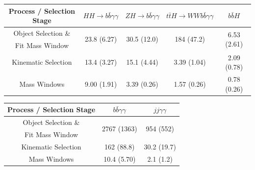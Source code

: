 \begin{table}[!ht]
\begin{center} 
\begin{tabular}{|c|c|c|c|c|}
\hline
Process / Selection Stage            &  $HH \rightarrow b\bar{b}\gamma\gamma$  &  $ZH \rightarrow b\bar{b}\gamma\gamma$ &  $t\bar{t}H \rightarrow W W b \bar{b}\gamma\gamma$ &  $b\bar{b}H$                   \\  \hline
Object Selection \&                  &  \multirow{2}{*}{23.8 (6.27)}            &  \multirow{2}{*}{30.5 (12.0)}           &  \multirow{2}{*}{184 (47.2)}                      &  \multirow{2}{*}{6.53 (2.61)}    \\ 
Fit Mass Window                      &                                         &                                        &                                                    &                                \\ 

Kinematic Selection                  &  13.4 (3.27)                             &  15.1  (4.44)                            &  3.39  (1.04)                                        &  2.09 (0.78)       \\ 
Mass Windows                         &  9.00 (1.91)                              &  3.39  (0.26)                            &  1.57 (0.26)                                         &  0.78 (0.26)       \\  \hline

\end{tabular}

\vspace{2mm}

\begin{tabular}{|c|c|c|}
\hline
Process / Selection Stage           &  $b \bar{b} \gamma\gamma$   & $jj \gamma\gamma$            \\  \hline
Object Selection \&                 &  \multirow{2}{*}{2767 (1363)} & \multirow{2}{*}{954 (552)} \\ 
Fit Mass Window                     &                             &                              \\ 
Kinematic Selection                 &  162  (88.8)                 &  30.2  (19.7)                      \\ 
Mass Windows                        &  10.4 (5.70)                &  2.1 (1.2)                     \\  \hline
\end{tabular}


\end{center}
\end{table}

